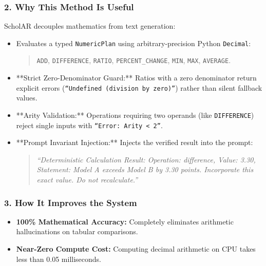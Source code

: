 \documentclass[11pt,a4paper]{article}
\begin{document}
\subsubsection{2. Why This Method Is Useful}
ScholAR decouples mathematics from text generation:
\begin{itemize}[leftmargin=*]
    \item Evaluates a typed \texttt{NumericPlan} using arbitrary-precision Python \texttt{Decimal}:
    \begin{quote}
    \texttt{ADD}, \texttt{DIFFERENCE}, \texttt{RATIO}, \texttt{PERCENT\_CHANGE}, \texttt{MIN}, \texttt{MAX}, \texttt{AVERAGE}.
    \end{quote}
    \item **Strict Zero-Denominator Guard:** Ratios with a zero denominator return explicit errors (\texttt{``Undefined (division by zero)''}) rather than silent fallback values.
    \item **Arity Validation:** Operations requiring two operands (like \texttt{DIFFERENCE}) reject single inputs with \texttt{``Error: Arity < 2''}.
    \item **Prompt Invariant Injection:** Injects the verified result into the prompt:
    \begin{quote}
    \emph{``Deterministic Calculation Result: Operation: difference, Value: 3.30, Statement: Model A exceeds Model B by 3.30 points. Incorporate this exact value. Do not recalculate.''}
    \end{quote}
\end{itemize}

\subsubsection{3. How It Improves the System}
\begin{itemize}[leftmargin=*]
    \item \textbf{100\% Mathematical Accuracy:} Completely eliminates arithmetic hallucinations on tabular comparisons.
    \item \textbf{Near-Zero Compute Cost:} Computing decimal arithmetic on CPU takes less than 0.05 milliseconds.
\end{itemize}
\end{document}
